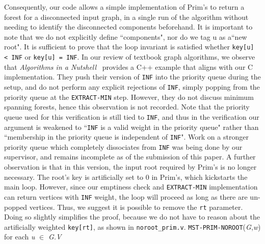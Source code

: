 \newline\newline
Consequently, our code allows a simple implementation of Prim's to return a forest for a disconnected input graph, in a single run of the algorithm without needing to identify the disconnected components beforehand. It is important to note that we do not explicitly define ``components", nor do we tag u as a``new root". It is sufficient to prove that the loop invariant is satisfied whether \texttt{key[u] < INF} or \texttt{key[u] = INF}.
\newline\newline
In our review of textbook graph algorithms, we observe that \textit{Algorithms in a Nutshell}~\cite{heineman2008algorithms} provides a C++ example that aligns with our C implementation. They push their version of \texttt{INF} into the priority queue during the setup, and do not perform any explicit rejections of \texttt{INF}, simply popping from the priority queue at the \texttt{EXTRACT-MIN} step. However, they do not discuss minimum spanning forests, hence this observation is not recorded.
\newline\newline
Note that the priority queue used for this verification is still tied to \texttt{INF}, and thus in the verification our argument is weakened to ``\texttt{INF} is a valid weight in the priority queue" rather than ``membership in the priority queue is independent of \texttt{INF}". Work on a stronger priority queue which completely dissociates from \texttt{INF} was being done by our supervisor, and remains incomplete as of the submission of this paper.
\newline\newline
A further observation is that in this version, the input root required by Prim's is no longer necessary. The root's key is artificially set to 0 in Prim's, which kickstarts the main loop. However, since our emptiness check and \texttt{EXTRACT-MIN} implementation can return vertices with \texttt{INF} weight, the loop will proceed as long as there are un-popped vertices. Thus, we suggest it is possible to remove the \texttt{rt} parameter. Doing so slightly simplifies the proof, because we do not have to reason about the artificially weighted \texttt{key[rt]}, as shown in \texttt{noroot\_prim.v}.
\newline\newline
	\texttt{MST-PRIM-NOROOT}(\textit{G},\textit{w})
	\newline
	for each \textit{u} $\in$ \textit{G.V}
